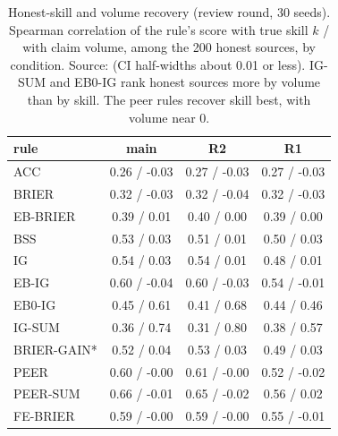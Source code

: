 \documentclass[10pt]{article}
\begin{document}
\begin{table}[!ht]
\centering\small
\caption{Honest-skill and volume recovery (review round, 30 seeds). Spearman correlation of the rule's score with true skill $k$ / with claim volume, among the 200 honest sources, by condition. Source:  (CI half-widths about 0.01 or less). IG-SUM and EB0-IG rank honest sources more by volume than by skill. The peer rules recover skill best, with volume near 0.}
\label{tab:skillvol}
\begin{tabular}{@{}lccc@{}}
\toprule
rule & main & R2 & R1 \\
\midrule
ACC & 0.26 / -0.03 & 0.27 / -0.03 & 0.27 / -0.03 \\
BRIER & 0.32 / -0.03 & 0.32 / -0.04 & 0.32 / -0.03 \\
EB-BRIER & 0.39 / 0.01 & 0.40 / 0.00 & 0.39 / 0.00 \\
BSS & 0.53 / 0.03 & 0.51 / 0.01 & 0.50 / 0.03 \\
IG & 0.54 / 0.03 & 0.54 / 0.01 & 0.48 / 0.01 \\
EB-IG & 0.60 / -0.04 & 0.60 / -0.03 & 0.54 / -0.01 \\
EB0-IG & 0.45 / 0.61 & 0.41 / 0.68 & 0.44 / 0.46 \\
IG-SUM & 0.36 / 0.74 & 0.31 / 0.80 & 0.38 / 0.57 \\
BRIER-GAIN* & 0.52 / 0.04 & 0.53 / 0.03 & 0.49 / 0.03 \\
PEER & 0.60 / -0.00 & 0.61 / -0.00 & 0.52 / -0.02 \\
PEER-SUM & 0.66 / -0.01 & 0.65 / -0.02 & 0.56 / 0.02 \\
FE-BRIER & 0.59 / -0.00 & 0.59 / -0.00 & 0.55 / -0.01 \\
\bottomrule
\end{tabular}
\end{table}

\begin{table}[!ht]
\centering\footnotesize
\caption{Recalibration under one misspecified (asymmetric) distortion, R2asym: $c=0.5+0.5(2p-1)^{\gamma}$ for $p\ge0.5$, $c=p$ otherwise, $\gamma=2.1036$ (mean baseline error 0.045, matched to R2's 0.044). Learned-cheater percentile, mean [95\% CI over 30 seeds]. Mean baseline error: raw 0.045, logistic 0.027, isotonic 0.032. One shape and one size only; IG-SUM with the logistic baseline has one seed at 48.1. * Post hoc rule. Source: .}
\label{tab:asym}
\end{table}
\end{document}
